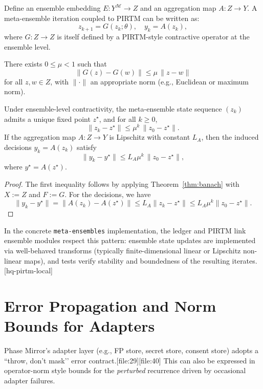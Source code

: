 \documentclass[11pt]{article}
\begin{document}
Define an ensemble embedding \(E : Y^\mathcal{M} \to Z\) and an aggregation map \(A : Z \to Y\). A meta-ensemble iteration coupled to PIRTM can be written as:
\[
  z_{k+1} = G(z_k; \theta), \quad
  y_k = A(z_k),
\]
where \(G : Z \to Z\) is itself defined by a PIRTM-style contractive operator at the ensemble level.

\begin{assumption}
There exists \(0 \leq \mu < 1\) such that
\[
  \|G(z) - G(w)\| \leq \mu \, \|z - w\|
\]
for all \(z,w \in Z\), with \(\|\cdot\|\) an appropriate norm (e.g., Euclidean or maximum norm).
\end{assumption}

\begin{proposition}
Under ensemble-level contractivity, the meta-ensemble state sequence \((z_k)\) admits a unique fixed point \(z^\star\), and for all \(k\geq 0\),
\[
  \|z_k - z^\star\| \leq \mu^k \, \|z_0 - z^\star\|.
\]
If the aggregation map \(A:Z\to Y\) is Lipschitz with constant \(L_A\), then the induced decisions \(y_k = A(z_k)\) satisfy
\[
  \|y_k - y^\star\| \leq L_A \mu^k \, \|z_0 - z^\star\|,
\]
where \(y^\star = A(z^\star)\).
\end{proposition}

\begin{proof}
The first inequality follows by applying Theorem~\ref{thm:banach} with \(X:=Z\) and \(F:=G\). For the decisions, we have
\[
  \|y_k - y^\star\| = \|A(z_k) - A(z^\star)\| \leq L_A \|z_k - z^\star\|
  \leq L_A \mu^k \|z_0 - z^\star\|.
\]
\end{proof}

In the concrete \texttt{meta-ensembles} implementation, the ledger and PIRTM link ensemble modules respect this pattern: ensemble state updates are implemented via well-behaved transforms (typically finite-dimensional linear or Lipschitz non-linear maps), and tests verify stability and boundedness of the resulting iterates.[hq-pirtm-local]

\section{Error Propagation and Norm Bounds for Adapters}

Phase Mirror’s adapter layer (e.g., FP store, secret store, consent store) adopts a ``throw, don’t mask’’ error contract.[file:29][file:40] This can also be expressed in operator-norm style bounds for the \emph{perturbed} recurrence driven by occasional adapter failures.
\end{document}
